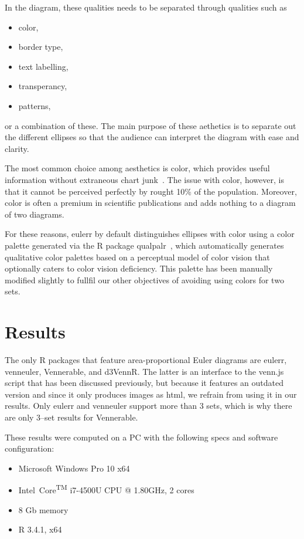 \documentclass[a4paper,nofonts,nobib,titlepage,justified,marginals=raggedouter,nohyper]{tufte-handout}\usepackage[]{graphicx}\usepackage[]{color}
\newcommand{\pkg}[1]{{\fontseries{b}\selectfont #1}}
\begin{document}
In the diagram, these qualities needs to be separated through qualities such
as
%
\begin{itemize}
\item color,
\item border type,
\item text labelling,
\item transperancy,
\item patterns,
\end{itemize}
%
or a combination of these. The main purpose of these aethetics is to
separate out the different ellipses so that the audience can interpret the
diagram with ease and clarity.

The most common choice among aesthetics is color, which provides useful
information without extraneous chart junk~\citep{tufte_x}. The issue with color,
however, is that it cannot be perceived perfectly by rought 10\% of the
population. Moreover, color is often a premium in scientific publications and
adds nothing to a diagram of two diagrams.

For these reasons, \pkg{eulerr} by default distinguishes ellipses with color
using a color palette generated via the \pkg{R} package
\pkg{qualpalr}~\citep{larsson_2016}, which automatically generates qualitative color
palettes based on a perceptual model of color vision that optionally caters
to color vision deficiency. This palette has been manually modified slightly to
fullfil our other objectives of avoiding using colors for two sets.

\section{Results}
\label{sec:results}

The only \pkg{R} packages that feature area-proportional Euler diagrams are
\pkg{eulerr}, \pkg{venneuler}, \pkg{Vennerable}, and \pkg{d3VennR}. The latter is an
interface to the \pkg{venn.js} script that has been discussed previously, but
because it features an outdated version and since it only produces
images as html, we refrain from using it in our results. Only \pkg{eulerr} and
\pkg{venneuler} support more than 3 sets, which is why there are only 3--set
results for \pkg{Vennerable}.

These results were computed on a PC with the following specs and software
configuration:
\begin{itemize}
\item Microsoft Windows Pro 10 x64
\item Intel\textregistered~Core\textsuperscript{TM} i7-4500U CPU @ 1.80GHz, 2 cores
\item 8 Gb memory
\item R 3.4.1, x64
\end{itemize}
\end{document}
